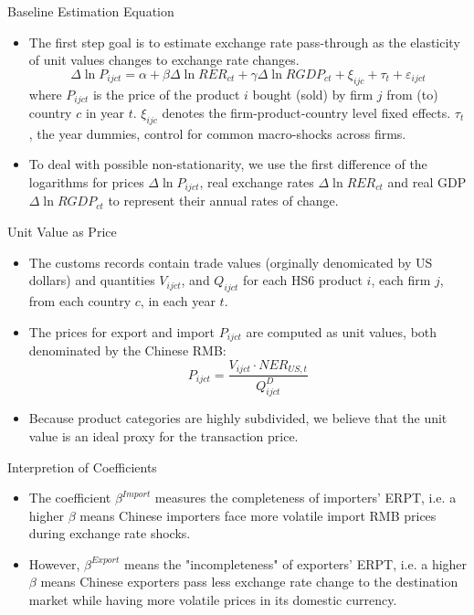 \documentclass[10pt]{beamer}
\begin{document}
\begin{frame}{Baseline Estimation Equation}
	\begin{itemize}
		\item The first step goal is to estimate exchange rate pass-through as the elasticity of unit values changes to exchange rate changes.
		\begin{equation}
			\Delta \ln P_{i j c t}=\alpha+\beta \Delta \ln R E R_{c t}+\gamma \Delta \ln R G D P_{c t}+\xi_{i j c}+\tau_{t}+\varepsilon_{i j c t}
			\label{eq4.1}
		\end{equation}
		{\footnotesize where $P_{ijct}$ is the price of the product $i$ bought (sold) by firm $j$ from (to) country $c$ in year $t$.  $\xi_{ijc}$ denotes the firm-product-country level fixed effects. $\tau_t$, the year dummies, control for common macro-shocks across firms.}
		\item To deal with possible non-stationarity, we use the first difference of the logarithms for prices $\Delta \ln P_{i j c t}$, real exchange rates $\Delta \ln R E R_{c t}$ and real GDP $\Delta \ln R G D P_{c t}$ to represent their annual rates of change.
	\end{itemize}
\end{frame}

\begin{frame}{Unit Value as Price}
	\begin{itemize}
		\item The customs records contain trade values (orginally denomicated by US dollars) and quantities $V_{ijct}$, and $Q_{ijct}$ for each HS6 product $i$, each firm $j$, from each country $c$, in each year $t$.
		\item The prices for export and import $P_{i j c t}$ are computed as unit values, both denominated by the Chinese RMB:
		$$
		P_{ijct}=\frac{V_{ijct}\cdot NER_{US,t}}{Q^{D}_{ijct}}
		$$
		\item Because product categories are highly subdivided, we believe that the unit value is an ideal proxy for the transaction price.
	\end{itemize}
\end{frame}

\begin{frame}{Interpretion of Coefficients}
	\begin{itemize}
		\item The coefficient $\beta^{Import}$ measures the completeness of importers' ERPT, i.e. a higher $\beta$ means Chinese importers face more volatile import RMB prices during exchange rate shocks.
		\item However,  $\beta^{Export}$ means the "incompleteness" of exporters' ERPT, i.e. a higher $\beta$ means Chinese exporters pass less exchange rate change to the destination market while having more volatile prices in its domestic currency.
	\end{itemize}
\end{frame}
\end{document}
